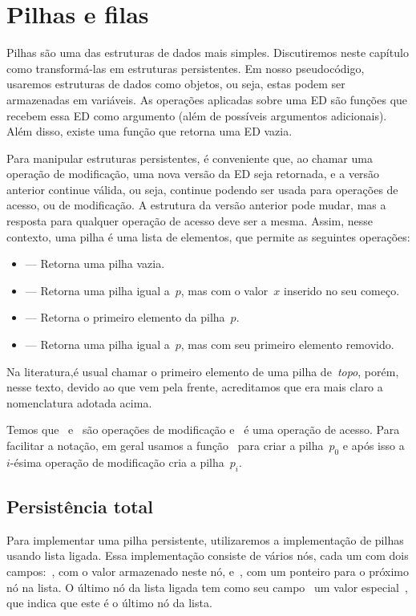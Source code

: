 \documentclass[../../main.tex]{subfiles}
\begin{document}
\chapter{Pilhas e filas} \label{cap:pilha_persist}
Pilhas são uma das estruturas de dados mais simples. Discutiremos neste capítulo como transformá-las em estruturas persistentes. Em nosso pseudocódigo, usaremos estruturas de dados como objetos, ou seja, estas podem ser armazenadas em variáveis. As operações aplicadas sobre uma ED são funções que recebem essa ED como argumento (além de possíveis argumentos adicionais). Além disso, existe uma função que retorna uma ED vazia.

Para manipular estruturas persistentes, é conveniente que, ao chamar uma operação de modificação, uma nova versão da ED seja retornada, e a versão anterior continue válida, ou seja, continue podendo ser usada para operações de acesso, ou de modificação. A estrutura da versão anterior pode mudar, mas a resposta para qualquer operação de acesso deve ser a mesma. Assim, nesse contexto, uma pilha é uma lista de elementos, que permite as seguintes operações:

\begin{itemize}
	\item {} --- Retorna uma pilha vazia.
	\item {} --- Retorna uma pilha igual a~$p$, mas com o valor~$x$ inserido no seu começo.
	\item {} --- Retorna o primeiro elemento da pilha~$p$.
	\item {} --- Retorna uma pilha igual a~$p$, mas com seu primeiro elemento removido.
\end{itemize}

Na literatura,é usual chamar o primeiro elemento de uma pilha de~\emph{topo}, porém, nesse texto, devido ao que vem pela frente, acreditamos que era mais claro a nomenclatura adotada acima.

Temos que~ e~ são operações de modificação e~ é uma operação de acesso. Para facilitar a notação, em geral usamos a função~ para criar a pilha~$p_0$ e após isso a~$i$-ésima operação de modificação cria a pilha~$p_i$.

\section{Persistência total}

Para implementar uma pilha persistente, utilizaremos a implementação de pilhas usando lista ligada. Essa implementação consiste de vários nós, cada um com dois campos:~, com o valor armazenado neste nó, e~, com um ponteiro para o próximo nó na lista. O último nó da lista ligada tem como seu campo~ um valor especial~, que indica que este é o último nó da lista.
\end{document}
